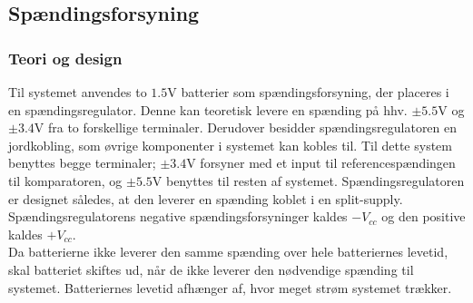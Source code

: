\subsection{Spændingsforsyning} \label{Spaendingsforsying}
\subsubsection{Teori og design}
Til systemet anvendes to $1.5$V batterier som spændingsforsyning, der placeres i en spændingsregulator. Denne kan teoretisk levere en spænding på hhv. $\pm5.5$V og $\pm3.4$V fra to forskellige terminaler. Derudover besidder spændingsregulatoren en jordkobling, som øvrige komponenter i systemet kan kobles til. Til dette system benyttes begge terminaler; $\pm3.4$V forsyner med et input til referencespændingen til komparatoren, og $\pm5.5$V benyttes til resten af systemet. Spændingsregulatoren er designet således, at den leverer en spænding koblet i en split-supply. Spændingsregulatorens negative spændingsforsyninger kaldes $-V_{cc}$ og den positive kaldes $+V_{cc}$. \\%
Da batterierne ikke leverer den samme spænding over hele batteriernes levetid, skal batteriet skiftes ud, når de ikke leverer den nødvendige spænding til systemet. Batteriernes levetid afhænger af, hvor meget strøm systemet trækker. %

